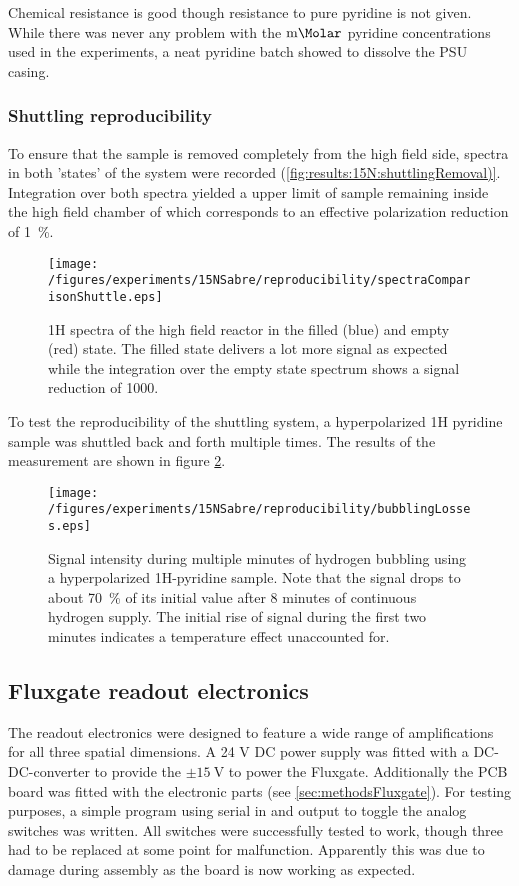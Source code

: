         Chemical resistance is good though resistance to pure pyridine is not given. While there was never
        any problem with the $\SI{}{\milli\Molar}$ pyridine concentrations used in the experiments, a
        neat pyridine batch showed to dissolve the PSU casing.
        \subsubsection{Shuttling reproducibility}
        To ensure that the sample is removed completely from the high field side, spectra in both 'states' of the system were recorded (\ref{fig:results:15N:shuttlingRemoval)}. Integration over both spectra yielded a upper limit of sample remaining inside the high field chamber of which corresponds to an effective polarization reduction of \SI{1}{\percent}.
        \begin{figure}
            \label{fig:results:15N:shuttlingRemoval}
            \centering
            \texttt{[image: /figures/experiments/15NSabre/reproducibility/spectraComparisonShuttle.eps]}
            \caption{1H spectra of the high field reactor in the filled (blue) and empty (red) state. The filled state delivers a lot more signal as expected while the integration over the empty state spectrum shows a signal reduction of 1000.}
        \end{figure}
        To test the reproducibility of the shuttling system, a hyperpolarized 1H pyridine sample was shuttled back and forth multiple times. The results of the measurement are shown in figure \ref{fig:results:15N:shuttlingReproducibility}. 
        \begin{figure}
            \label{fig:results:15N:shuttlingReproducibility}
            \centering
            \texttt{[image: /figures/experiments/15NSabre/reproducibility/bubblingLosses.eps]}
            \caption{Signal intensity during multiple minutes of hydrogen bubbling using a hyperpolarized 1H-pyridine sample. Note that the signal drops to about \SI{70}{\percent} of its initial value after 8 minutes of continuous hydrogen supply. The initial rise of signal during the first two minutes indicates a temperature effect unaccounted for.}
        \end{figure}
    \subsection{Fluxgate readout electronics}
        The readout electronics were designed to feature a wide range of amplifications for all
        three spatial dimensions. A 24 V DC power supply was fitted with a DC-DC-converter to
        provide the $\pm\SI{15}{\volt}$ to power the Fluxgate. Additionally the PCB board was fitted
        with the electronic parts (see \ref{sec:methodsFluxgate}). For testing purposes, a simple program
        using serial in and output to toggle the analog switches was written. All switches were
        successfully tested to work, though three had to be replaced at some point for malfunction.
        Apparently this was due to damage during assembly as the board is now working as expected.
